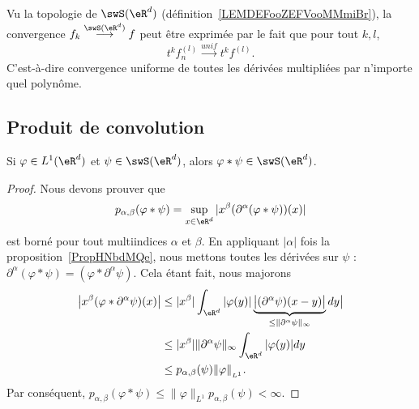 \begin{remark}
	Vu la topologie de \( \swS(\eR^d)\) (définition~\ref{LEMDEFooZEFVooMMmiBr}), la convergence \( f_k\stackrel{\swS(\eR^d)}{\longrightarrow}f\) peut être exprimée par le fait que pour tout \( k,l\),
	\begin{equation}
		t^kf_n^{(l)}\stackrel{unif}{\longrightarrow}t^kf^{(l)}.
	\end{equation}
	C'est-à-dire convergence uniforme de toutes les dérivées multipliées par n'importe quel polynôme.
\end{remark}

\subsection{Produit de convolution}

\begin{proposition}     \label{PROPooUNFYooYdbSbJ}
	Si \( \varphi\in L^1(\eR^d)\) et \( \psi\in\swS(\eR^d)\), alors \( \varphi * \psi\in \swS(\eR^d)\).
\end{proposition}

\begin{proof}
	Nous devons prouver que
	\begin{equation}
		p_{\alpha,\beta}(\varphi*\psi)=\sup_{x\in \eR^d}| x^{\beta}(\partial^{\alpha}(\varphi*\psi))(x) |
	\end{equation}
	est borné pour tout multiindices \( \alpha\) et \( \beta\). En appliquant \( | \alpha |\) fois la proposition~\ref{PropHNbdMQe}, nous mettons toutes les dérivées sur \( \psi\) : \( \partial^{\alpha}(\varphi*\psi)=(\varphi*\partial^{\alpha}\psi)\). Cela étant fait, nous majorons
	\begin{subequations}
		\begin{align}
			\big| x^{\beta}(\varphi*\partial^{\alpha}\psi)(x) \big| & \leq| x^{\beta} |\int_{\eR^d} |\varphi(y)|\underbrace{\big| (\partial^{\alpha}\psi)(x-y)\big|}_{\leq\| \partial^{\alpha}\psi \|_{\infty}} dy \big| \\
			                                                        & \leq | x^{\beta} |  \| \partial^{\alpha}\psi \|_{\infty}\int_{\eR^d}| \varphi(y) |dy                                                               \\
			                                                        & \leq p_{\alpha,\beta}(\psi)\| \varphi \|_{_{L^1}}.
		\end{align}
	\end{subequations}
	Par conséquent, \( p_{\alpha,\beta}(\varphi*\psi)\leq \| \varphi \|_{L^1}p_{\alpha,\beta}(\psi)<\infty\).
\end{proof}

